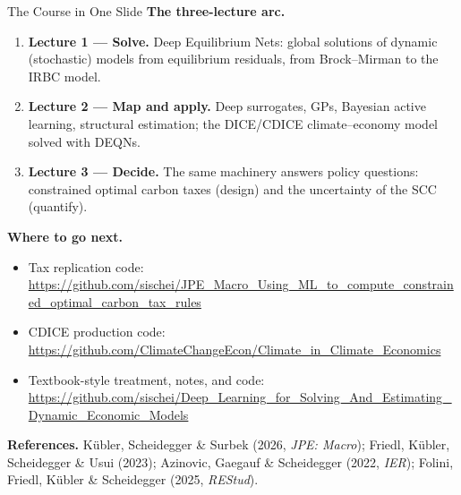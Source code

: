 \documentclass[aspectratio=169,11pt]{beamer}
\begin{document}
\begin{frame}{The Course in One Slide}
\footnotesize
\textbf{The three-lecture arc.}
\begin{enumerate}\itemsep2pt
    \item \textbf{Lecture 1 --- Solve.} Deep Equilibrium Nets: global solutions of dynamic (stochastic) models from equilibrium residuals, from Brock--Mirman to the IRBC model.
    \item \textbf{Lecture 2 --- Map and apply.} Deep surrogates, GPs, Bayesian active learning, structural estimation; the DICE/CDICE climate--economy model solved with DEQNs.
    \item \textbf{Lecture 3 --- Decide.} The same machinery answers policy questions: constrained optimal carbon taxes (design) and the uncertainty of the SCC (quantify).
\end{enumerate}

\vspace{0.2em}
\textbf{Where to go next.}
\begin{itemize}\itemsep2pt
    \item Tax replication code: {\scriptsize \url{https://github.com/sischei/JPE_Macro_Using_ML_to_compute_constrained_optimal_carbon_tax_rules}}
    \item CDICE production code: {\scriptsize \url{https://github.com/ClimateChangeEcon/Climate_in_Climate_Economics}}
    \item Textbook-style treatment, notes, and code: {\scriptsize \url{https://github.com/sischei/Deep_Learning_for_Solving_And_Estimating_Dynamic_Economic_Models}}
\end{itemize}

\vspace{0.2em}
{\scriptsize \textbf{References.} K\"ubler, Scheidegger \& Surbek (2026, \emph{JPE: Macro}); Friedl, K\"ubler, Scheidegger \& Usui (2023); Azinovic, Gaegauf \& Scheidegger (2022, \emph{IER}); Folini, Friedl, K\"ubler \& Scheidegger (2025, \emph{REStud}).}
\end{frame}
\end{document}
